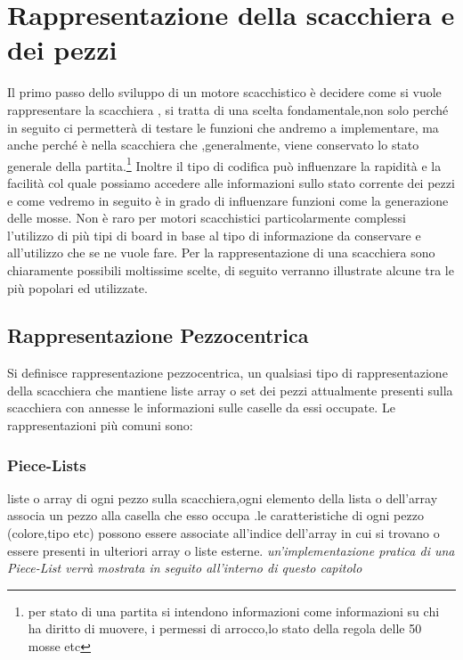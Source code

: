 \section{Rappresentazione della scacchiera e dei pezzi} %
Il primo passo dello sviluppo di un motore scacchistico è decidere come si vuole rappresentare 
la scacchiera , si tratta di una scelta fondamentale,non solo perché in seguito ci permetterà
di testare le funzioni che andremo a implementare, ma anche perché è nella scacchiera che ,generalmente,
viene conservato lo stato generale della partita.\footnote{per stato di una partita si intendono informazioni come
informazioni su chi ha diritto di muovere, i permessi di arrocco,lo stato della regola delle 50 mosse etc} 
Inoltre il tipo di codifica può influenzare la rapidità
e la facilità col quale possiamo accedere alle informazioni sullo stato corrente dei pezzi 
e come vedremo in seguito è in grado di influenzare funzioni come la generazione delle mosse.
Non è raro per motori scacchistici particolarmente complessi l'utilizzo di più tipi di board in base
al tipo di informazione da conservare e all'utilizzo che se ne vuole fare.
Per la rappresentazione di una scacchiera sono chiaramente possibili moltissime scelte, di seguito
verranno illustrate alcune tra le più popolari ed utilizzate.

\subsection{Rappresentazione Pezzocentrica}
Si definisce rappresentazione pezzocentrica, un qualsiasi tipo di rappresentazione della scacchiera che mantiene liste
array o set dei pezzi attualmente presenti sulla scacchiera con annesse le informazioni sulle caselle da essi occupate.
Le rappresentazioni più comuni sono: 
\subsubsection{Piece-Lists}
liste o array di ogni pezzo sulla scacchiera,ogni elemento della lista o dell'array associa un pezzo
alla casella che esso occupa .le caratteristiche di ogni pezzo (colore,tipo etc) 
 possono essere associate all'indice dell'array in cui si trovano o essere presenti in ulteriori array 
 o liste esterne. \emph{un'implementazione pratica di una Piece-List verrà mostrata in seguito all'interno
 di questo capitolo}
 
